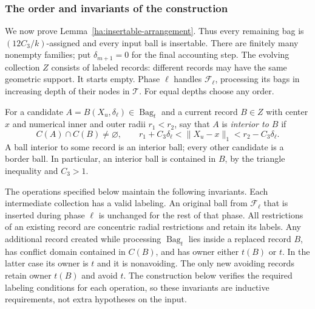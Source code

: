 \subsubsection{The order and invariants of the construction}
\label{ha:order}

We now prove Lemma~\ref{ha:insertable-arrangement}.  Thus every remaining
bag is $(12C_3/k)$-assigned and every input ball is insertable.  There
are finitely many nonempty families; put $\delta_{m+1}=0$ for the final
accounting step.  The evolving collection $Z$ consists of labeled
records: different records may have the same geometric support.
It starts empty.  Phase $\ell$ handles $\mathcal F_\ell$, processing
its bags in increasing depth of their nodes in $\mathcal T$.
For equal depths choose any order.

For a candidate $A=B(X_u,\delta_\ell)\in\operatorname{Bag}_t$ and
a current record $B\in Z$ with center $x$ and numerical inner and
outer radii $r_1<r_2$, say that $A$ is
\emph{interior to $B$} if
\begin{equation}\label{ha:interior}
 C(A)\cap C(B)\ne\varnothing,\qquad
 r_1+C_3\delta_\ell<\|X_u-x\|_1<r_2-C_3\delta_\ell.
\end{equation}
A ball interior to some record is an interior ball; every other
candidate is a border ball.  In particular, an interior ball is
contained in $B$, by the triangle inequality and $C_3>1$.

The operations specified below maintain the following invariants.
Each intermediate collection has a valid labeling.  An original
ball from $\mathcal F_\ell$ that is inserted during phase $\ell$
is unchanged for the rest of that phase.  All restrictions of an
existing record are concentric radial restrictions and retain its
labels.  Any additional record created while processing
$\operatorname{Bag}_t$ lies inside a replaced record $B$, has conflict
domain contained in $C(B)$, and has owner either $t(B)$ or $t$.
In the latter case its owner is $t$ and it is nonavoiding.  The only
new avoiding records retain owner $t(B)$ and avoid $t$.
The construction below verifies the required labeling conditions
for each operation, so these invariants are inductive requirements,
not extra hypotheses on the input.

